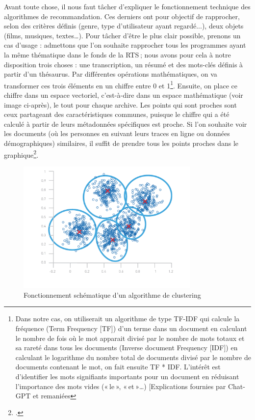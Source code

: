 Avant toute chose, il nous faut tâcher d’expliquer le fonctionnement technique des algorithmes de recommandation. Ces derniers ont pour objectif de rapprocher, selon des critères définis (genre, type d'utilisateur ayant regardé...), deux objets (films, musiques, textes…). Pour tâcher d’être le plus clair possible, prenons un cas d’usage : admettons que l'on souhaite rapprocher tous les programmes ayant la même thématique dans le fonds de la RTS ; nous avons pour cela à notre disposition trois choses : une transcription, un résumé et des mots-clés définis à partir d’un thésaurus. Par différentes opérations mathématiques, on va transformer ces trois éléments en un chiffre entre 0 et 1\footnote{  Dans notre cas, on utiliserait un algorithme de type TF-IDF qui calcule la fréquence (Term Frequency [TF]) d’un terme dans un document en calculant le nombre de fois où le mot apparait divisé par le nombre de mots totaux et sa rareté dans tous les documents (Inverse document Frequency [IDF]) en calculant le logarithme du nombre total de documents divisé par le nombre de documents contenant le mot, on fait ensuite TF * IDF. L’intérêt est d’identifier les mots signifiants importants pour un document en réduisant l’importance des mots vides (« le », « et »…) [Explications fournies par Chat-GPT et remaniées}. Ensuite, on place ce chiffre dans un espace vectoriel, c’est-à-dire dans un espace mathématique (voir image ci-après), le tout pour chaque archive. Les points qui sont proches sont ceux partageant des caractéristiques communes, puisque le chiffre qui a été calculé à partir de leurs métadonnées spécifiques est proche. Si l'on souhaite voir les documents (où les personnes en suivant leurs traces en ligne ou données démographiques) similaires, il suffit de prendre tous les points proches dans le graphique\footcite{zotero-216}.


\begin{figure}[h!]
	\centering
	\includegraphics[width=0.8\textwidth]{images/image10.png}
	\caption{Fonctionnement schématique d'un algorithme de clustering}
	\label{fig:image10}
\end{figure}

